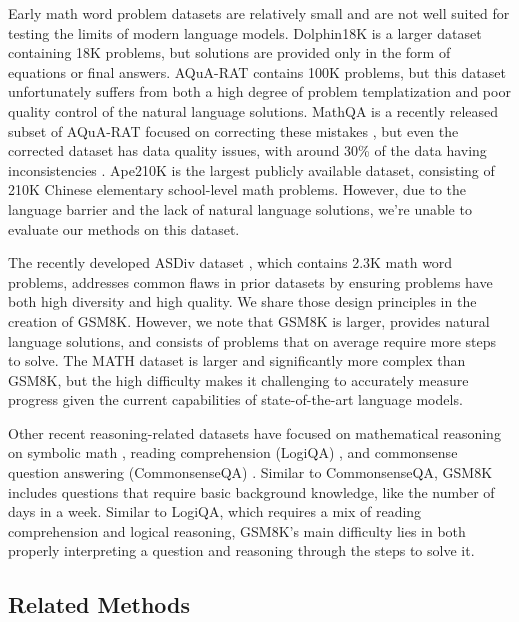 {Early math word problem datasets \citep{kushman2014learning, roy-roth-2015-solving} are relatively small and are not well suited for testing the limits of modern language models. Dolphin18K \citep{huang2016well} is a larger dataset containing 18K problems, but solutions are provided only in the form of equations or final answers. AQuA-RAT \citep{ling2017program} contains 100K problems, but this dataset unfortunately suffers from both a high degree of problem templatization and poor quality control of the natural language solutions. MathQA is a recently released subset of AQuA-RAT focused on correcting these mistakes \citep{amini2019mathqa}, but even the corrected dataset has data quality issues, with around 30\% of the data having inconsistencies \citep{miao2021diverse}. Ape210K \citep{zhao2020ape210k} is the largest publicly available dataset, consisting of 210K Chinese elementary school-level math problems. However, due to the language barrier and the lack of natural language solutions, we're unable to evaluate our methods on this dataset.

The recently developed ASDiv dataset \citep{miao2021diverse}, which contains 2.3K math word problems, addresses common flaws in prior datasets by ensuring problems have both high diversity and high quality. We share those design principles in the creation of GSM8K. However, we note that GSM8K is larger, provides natural language solutions, and consists of problems that on average require more steps to solve. The MATH dataset \citep{hendrycks2021measuring} is larger and significantly more complex than GSM8K, but the high difficulty makes it challenging to accurately measure progress given the current capabilities of state-of-the-art language models.

Other recent reasoning-related datasets have focused on mathematical reasoning on symbolic math \citep{lample2019deep}, reading comprehension (LogiQA) \citep{Liu2020LogiQAAC}, and commonsense question answering (CommonsenseQA) \citep{talmor2018commonsenseqa}. Similar to CommonsenseQA, GSM8K includes questions that require basic background knowledge, like the number of days in a week. Similar to LogiQA, which requires a mix of reading comprehension and logical reasoning, GSM8K's main difficulty lies in both properly interpreting a question and reasoning through the steps to solve it.

\subsection{Related Methods}

}
